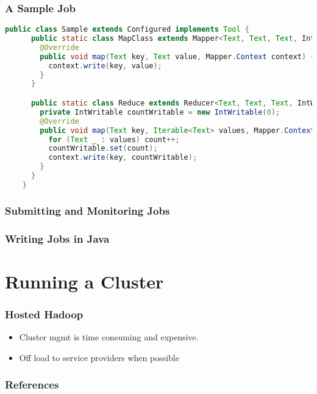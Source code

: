 \documentclass{beamer}
\begin{document}
\begin{frame}[fragile]
  \frametitle{A Sample Job}
  \begin{lstlisting}[language=java,basicstyle=\tiny\sffamily]
    public class Sample extends Configured implements Tool {
      public static class MapClass extends Mapper<Text, Text, Text, Int> {
        @Override
        public void map(Text key, Text value, Mapper.Context context) {
          context.write(key, value);
        }
      }

      public static class Reduce extends Reducer<Text, Text, Text, IntWritable> {
        private IntWritable countWritable = new IntWritable(0);
        @Override
        public void map(Text key, Iterable<Text> values, Mapper.Context context) {
          for (Text _ : values) count++;
          countWritable.set(count);
          context.write(key, countWritable);
        }
      }
    }
  \end{lstlisting}
\end{frame}


\frame
{
  \frametitle{Submitting and Monitoring Jobs}

}

\frame
{
  \frametitle{Writing Jobs in Java}
}


\section{Running a Cluster}

\frame 
{
  \frametitle{Hosted Hadoop}
  \begin{itemize}
    \item Cluster mgmt is time consuming and expensive.
    \item Off load to service providers when possible
  \end{itemize}
}


\frame
{
  \frametitle{References}
  \printbibliography
}
\end{document}

